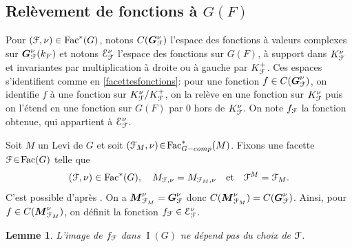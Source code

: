 \documentclass[11pt]{article}
\numberwithin{equation}{section}\providecommand{\og}{«\,}\providecommand{\fg}{\,»}
\let\mathcal \EuScript
\newcommand{\quadet}{\quad\text{et}\quad}
\newcommand{\tcomp}{\textup{-comp}}
\newcommand{\Fac}{\mathrm{Fac}}
\DeclareMathOperator{\rI}{I}
\newcommand{\bG}{\boldsymbol{G}}
\newcommand{\bM}{\boldsymbol{M}}
\newcommand{\cE}{\mathcal{E}}
\newcommand{\cF}{\mathcal{F}}
\theoremstyle{plain}
\newtheorem*{lem*}{Lemme}
\theoremstyle{definition}
\begin{document}
\subsection{Relèvement de fonctions à \texorpdfstring{$G(F)$}{GF}}\label{relevement}
Pour $(\cF,\nu)\in \Fac^*(G)$, notons $C(\bG_{\cF}^{\nu})$ l'espace des fonctions à valeurs complexes sur $\bG_{\cF}^{\nu}(k_{F})$ et notons $\cE_{\cF}^{\nu}$ l'espace des fonctions sur $G(F)$, à support dans $K_{\cF}^{\nu}$ et invariantes par multiplication à droite ou à gauche par $K_{\cF}^+$. Ces espaces s'identifient comme en \ref{facettesfonctions}: pour une fonction $f\in C(\bG_{\cF}^{\nu})$, on identifie $f$ à une fonction sur $K_{\cF}^{\nu}/K_{\cF}^+$, on la relève en une fonction sur $K_{\cF}^{\nu}$ puis on l'étend en une fonction sur $G(F)$ par $0$ hors de $K_{\cF}^{\nu}$. On note $f_{\cF}$ la fonction obtenue, qui appartient à $\cE_{\cF}^{\nu}$.

Soit $M$ un Levi de $G$ et soit $(\cF_{M},\nu)\!\in\!\Fac^*_{G\tcomp}(M)$. Fixons une facette $\cF\!\in\!\Fac(G)$ telle que
\[
(\cF,\nu)\in \Fac^*(G),\quad M_{\cF,\nu}=M_{\cF_{M},\nu}\quadet \cF^M=\cF_{M}.
\]
C'est possible d'après \cite[Lem.\,6\,\&\,7]{W2}. On a $\bM_{\cF_{M}}^{\nu}=\bG_{\cF}^{\nu}$ donc $C(\bM_{\cF_{M}}^{\nu})=C(\bG_{\cF}^{\nu})$. Ainsi, pour $f\in C(\bM_{\cF_{M}}^{\nu})$, on définit la fonction $f_{\cF}\in \cE_{\cF}^{\nu}$.

\begin{lem*}
L'image de $f_{\cF}$ dans $\rI(G)$ ne dépend pas du choix de $\cF$.\end{lem*}
\end{document}

